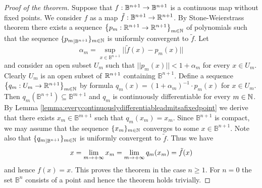 \begin{proof}[Proof of the theorem]
Suppose that $f:\mathbb{B}^{n+1}\rightarrow \mathbb{B}^{n+1}$ is a continuous map without fixed points. We consider $f$ as a map $\tilde{f}:\mathbb{B}^{n+1}\rightarrow {\mathbb R}^{n+1}$. By Stone-Weierstrass theorem there exists a sequence $\big\{p_m:{\mathbb R}^{n+1}\rightarrow {\mathbb R}^{n+1}\big\}_{m\in {\mathbb N}}$ of polynomials such that the sequence $\{{p_m}_{\mid \mathbb{B}^{n+1}}\}_{m\in {\mathbb N}}$ is uniformly convergent to $\tilde{f}$. Let
$$\alpha_m = \sup_{x\in \mathbb{B}^{n+1}}||\tilde{f}(x) - p_m(x)||$$
and consider an open subset $U_m$ such that $||p_m(x)|| < 1+\alpha_m$ for every $x\in U_m$. Clearly $U_m$ is an open subset of ${\mathbb R}^{n+1}$ containing $\mathbb{B}^{n+1}$. Define a sequence $\big\{q_m:U_m\rightarrow {\mathbb R}^{n+1}\big\}_{m\in {\mathbb N}}$ by formula $q_m(x) = (1 + \alpha_m)^{-1}\cdot p_m(x)$ for $x\in U_m$. Then $q_m(\mathbb{B}^{n+1}) \subseteq \mathbb{B}^{m+1}$ and $q_m$ is continuously differentiable for every $m\in {\mathbb N}$. By Lemma \ref{lemma:everycontinuouslydifferentiableadmitsafixedpoint} we derive that there exists $x_m \in \mathbb{B}^{m+1}$ such that $q_m(x_m) = x_m$. Since $\mathbb{B}^{n+1}$ is compact, we may assume that the sequence $\{x_m\}_{m\in {\mathbb N}}$ converges to some $x\in \mathbb{B}^{n+1}$. Note also that $\{{q_m}_{\mid \mathbb{B}^{n+1}}\}_{m\in {\mathbb N}}$ is uniformly convergent to $\tilde{f}$. Thus we have
$$x = \lim_{m\rightarrow +\infty}x_m = \lim_{m\rightarrow +\infty}q_m(x_m) = \tilde{f}(x)$$
and hence $f(x) = x$. This proves the theorem in the case $n\geq 1$. For $n=0$ the set $\mathbb{B}^n$ consists of a point and hence the theorem holds trivially.
\end{proof}

































\small




